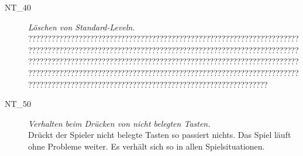 \begin{description}

\label{NT:40}
	
	\item[NT\_40] \textit{Löschen von Standard-Leveln.} \hfill\\
	??????????????????????????????????????????????????????????????????????????????????????????????????????????????????????????????????????????????????????????????????????????????????????????????????????????????????????????????????????????????????????????????????????????????????????????????????????????????????????????????????????????????????????\\
	


\label{NT:50}	
	
	\item[NT\_50] \textit{Verhalten beim Drücken von nicht belegten Tasten.} \hfill\\

	Drückt der Spieler nicht belegte Tasten so passiert nichts. Das Spiel läuft ohne Probleme weiter. Es verhält sich so in allen Spielsituationen.\\
	
\end{description}



